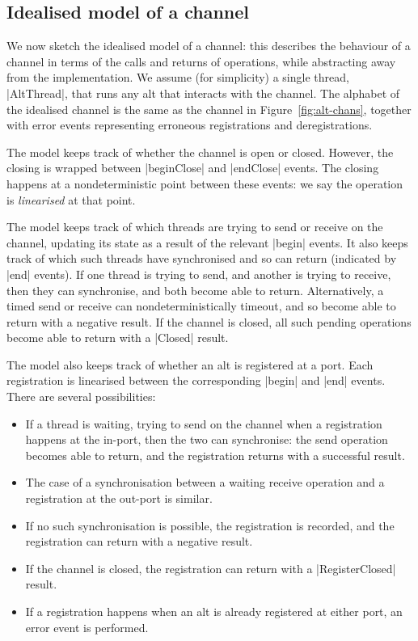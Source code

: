 \subsection{Idealised model of a channel}
\label{sec:idealisedChan}


We now sketch the idealised model of a channel: this describes the behaviour
of a channel in terms of the calls and returns of operations, while
abstracting away from the implementation.  We assume (for simplicity) a single
thread, |AltThread|, that runs any alt that interacts with the channel.
%
The alphabet of the idealised channel is the same as the channel in
Figure~\ref{fig:alt-chans}, together with error events representing erroneous
registrations and deregistrations.

The model keeps track of whether the channel is open or closed.  However, the
closing is wrapped between |beginClose| and |endClose| events.  The closing
happens at a nondeterministic point between these events: we say the
operation is \emph{linearised} at that point.

The model keeps track of which threads are trying to send or receive on the
channel, updating its state as a result of the relevant |begin| events.  It
also keeps track of which such threads have synchronised and so can return
(indicated by |end| events).  If one thread is trying to send, and another is
trying to receive, then they can synchronise, and both become able to return.
Alternatively, a timed send or receive can nondeterministically timeout, and
so become able to return with a negative result.  If the channel is closed,
all such pending operations become able to return with a |Closed| result.

The model also keeps track of whether an alt is registered at a port.  Each
registration is linearised between the corresponding |begin| and |end|
events.  There are several possibilities:
%
\begin{itemize}
\item If a thread is waiting, trying to send on the channel when a
  registration happens at the in-port, then the two can synchronise: the send
  operation becomes able to return, and the registration returns with a
  successful result.

\item The case of a synchronisation between a waiting receive operation and a
  registration at the out-port is similar.

\item If no such synchronisation is possible, the registration is recorded,
  and the registration can return with a negative result.

\item If the channel is closed, the registration can return with a
  |RegisterClosed| result. 

\item If a registration happens when an alt is already registered at either
  port, an error event is performed.
\end{itemize}

